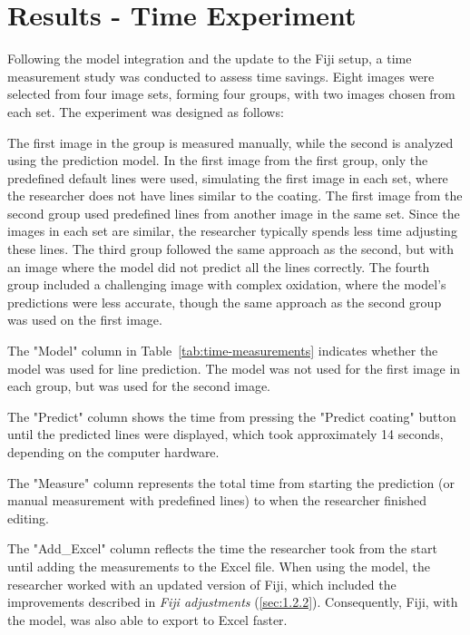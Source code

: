 \section{Results - Time Experiment}\label{sec:res}

Following the model integration and the update to the Fiji setup, a time measurement study was conducted to assess time savings. Eight images were selected from four image sets, forming four groups, with two images chosen from each set. The experiment was designed as follows:

The first image in the group is measured manually, while the second is analyzed using the prediction model. In the first image from the first group, only the predefined default lines were used, simulating the first image in each set, where the researcher does not have lines similar to the coating. The first image from the second group used predefined lines from another image in the same set. Since the images in each set are similar, the researcher typically spends less time adjusting these lines. The third group followed the same approach as the second, but with an image where the model did not predict all the lines correctly. The fourth group included a challenging image with complex oxidation, where the model's predictions were less accurate, though the same approach as the second group was used on the first image.

The "Model" column in Table~\ref{tab:time-measurements} indicates whether the model was used for line prediction. The model was not used for the first image in each group, but was used for the second image.

The "Predict" column shows the time from pressing the "Predict coating" button until the predicted lines were displayed, which took approximately 14 seconds, depending on the computer hardware. 

The "Measure" column represents the total time from starting the prediction (or manual measurement with predefined lines) to when the researcher finished editing. 

The "Add\_Excel" column reflects the time the researcher took from the start until adding the measurements to the Excel file. When using the model, the researcher worked with an updated version of Fiji, which included the improvements described in \textit{Fiji adjustments} (\ref{sec:1.2.2}). Consequently, Fiji, with the model, was also able to export to Excel faster.


